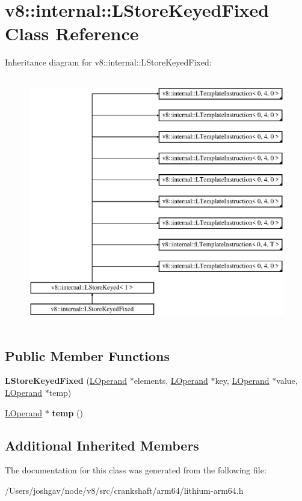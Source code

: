 \hypertarget{classv8_1_1internal_1_1_l_store_keyed_fixed}{}\section{v8\+:\+:internal\+:\+:L\+Store\+Keyed\+Fixed Class Reference}
\label{classv8_1_1internal_1_1_l_store_keyed_fixed}
Inheritance diagram for v8\+:\+:internal\+:\+:L\+Store\+Keyed\+Fixed\+:\begin{figure}[H]
\begin{center}
\leavevmode
\includegraphics[height=11.000000cm]{classv8_1_1internal_1_1_l_store_keyed_fixed}
\end{center}
\end{figure}
\subsection*{Public Member Functions}
\begin{DoxyCompactItemize}
\item 
{\bfseries L\+Store\+Keyed\+Fixed} (\hyperlink{classv8_1_1internal_1_1_l_operand}{L\+Operand} $\ast$elements, \hyperlink{classv8_1_1internal_1_1_l_operand}{L\+Operand} $\ast$key, \hyperlink{classv8_1_1internal_1_1_l_operand}{L\+Operand} $\ast$value, \hyperlink{classv8_1_1internal_1_1_l_operand}{L\+Operand} $\ast$temp)\hypertarget{classv8_1_1internal_1_1_l_store_keyed_fixed_aec3cad33322a333eaf669e745fd87d42}{}\label{classv8_1_1internal_1_1_l_store_keyed_fixed_aec3cad33322a333eaf669e745fd87d42}

\item 
\hyperlink{classv8_1_1internal_1_1_l_operand}{L\+Operand} $\ast$ {\bfseries temp} ()\hypertarget{classv8_1_1internal_1_1_l_store_keyed_fixed_a13c0fc938b7220a7a59e2b7aef8cf96b}{}\label{classv8_1_1internal_1_1_l_store_keyed_fixed_a13c0fc938b7220a7a59e2b7aef8cf96b}

\end{DoxyCompactItemize}
\subsection*{Additional Inherited Members}


The documentation for this class was generated from the following file\+:\begin{DoxyCompactItemize}
\item 
/\+Users/joshgav/node/v8/src/crankshaft/arm64/lithium-\/arm64.\+h\end{DoxyCompactItemize}
